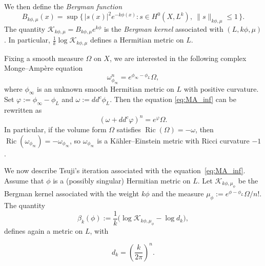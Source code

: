\documentclass[a4paper, 11pt]{amsart}
\theoremstyle{plain}
\numberwithin{equation}{section} %
\numberwithin{figure}{section} %
\theoremstyle{plain}
\theoremstyle{plain}
\theoremstyle{plain}
\theoremstyle{plain}
\theoremstyle{remark}
\newtheorem{remark}[theorem]{Remark}
\theoremstyle{definition}
\theoremstyle{definition}
\newcommand{\K}{\mathcal{K}}
\DeclareMathOperator \Ric {\textrm{Ric}}
\begin{document}
We then define the {\it Bergman function}
\begin{equation}
    B_{k\phi,\mu}(x) = \sup \{\, |s(x)|^2 e^{-k\phi(x)} \colon s \in H^0(X, L^k),\ \|s\|_{k\phi,\mu} \le 1 \,\}.
\end{equation}
The quantity $\K_{k\phi,\mu} = B_{k\phi,\mu} e^{k\phi}$ is the {\it Bergman kernel} associated with $(L, k\phi, \mu)$. In particular,
\(
\frac{1}{k} \log \K_{k\phi,\mu}
\)
defines a Hermitian metric on $L$.



\medskip
Fixing a smooth measure $\Omega$ on $X$, we are interested in the following complex Monge--Amp\`ere equation
\begin{equation}\label{eq:MA_inf}
    \omega^n_{\phi_\infty} = e^{\phi_\infty - \phi_L}\Omega,
\end{equation}
where 
$\phi_\infty$ is an unknown smooth Hermitian metric on $L$ with positive curvature. Set
$\varphi := \phi_\infty - \phi_L$ and $\omega := dd^c \phi_L$. Then the equation \eqref{eq:MA_inf} can be rewritten as 
\begin{equation}
(\omega + dd^c \varphi)^n = e^{\varphi}\Omega.
\end{equation}
{In particular, if the volume form $\Omega$ satisfies $\Ric(\Omega) = -\omega$, then}
$\Ric(\omega_{\phi_\infty}) = -\omega_{\phi_\infty}$, {so} $\omega_{\phi_\infty}$ is a K\"ahler--Einstein metric with Ricci curvature $-1$.
\medskip

We now describe Tsuji's iteration associated with the equation~\eqref{eq:MA_inf}.  
Assume that $\phi$ is a (possibly singular) Hermitian metric on $L$.  
Let $\K_{k\phi,\mu_\phi}$ be the Bergman kernel associated with the weight $k\phi$ and the measure $\mu_\phi := e^{\phi - \phi_L}\Omega / n!$. The quantity
\begin{equation}\label{eq_beta}
\beta_k(\phi) := \frac{1}{k}\bigl( \log \K_{k\phi,\mu_\phi} - \log d_k \bigr),
\end{equation}
defines again a metric on $L$, with


\[
d_k = \left( \frac{k}{2\pi} \right)^n.
\]



\end{document}
